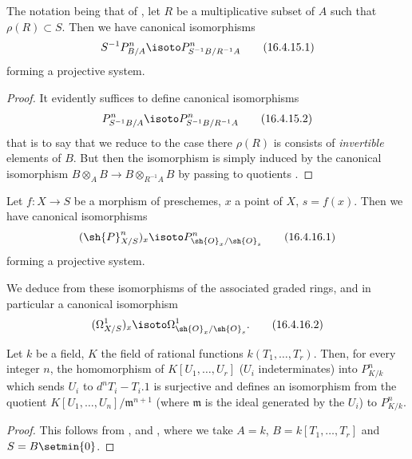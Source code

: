 \begin{corollary}[16.4.15]
\label{IV.16.4.15}
The notation being that of , let $R$ be a multiplicative subset of $A$ such that $\rho(R) \subset S$.
Then we have canonical isomorphisms 
\[
  \label{IV.16.4.15.1}
  S^{-1}P_{B/A}^n \isoto P_{S^{-1}B/R^{-1}A}^n
  \tag{16.4.15.1}
\]
forming a projective system.
\end{corollary}

\begin{proof}
It evidently suffices to define canonical isomorphisms 
\[
  \label{IV.16.4.15.2}
  P_{S^{-1}B/A}^n \isoto P_{S^{-1}B/R^{-1}A}^n
  \tag{16.4.15.2}
\]
that is to say that we reduce to the case there $\rho(R)$ is consists of \emph{invertible} elements of $B$.
But then the isomorphism  is simply induced by the canonical isomorphism $B \otimes_A B \to B \otimes_{R^{-1}A} B$ by passing to quotients .
\end{proof}

\begin{corollary}[16.4.16]
\label{IV.16.4.16}
Let $f:X \to S$ be a morphism of preschemes, $x$ a point of $X$, $s = f(x)$.
Then we have canonical isomorphisms
\[
  \label{IV.16.4.16.1}
  (\sh{P}_{X/S}^n)_x \isoto P_{\sh{O}_x/\sh{O}_s}^n
  \tag{16.4.16.1}
\]
forming a projective system.
\end{corollary}

We deduce from these isomorphisms of the associated graded rings, and in particular a canonical isomorphism
\[
  \label{IV.16.4.16.2}
  (\Omega_{X/S}^1)_x \isoto \Omega_{\sh{O}_x/\sh{O}_s}^1.
  \tag{16.4.16.2}
\]

\begin{corollary}[16.4.17]
\label{IV.16.4.17}
Let $k$ be a field, $K$ the field of rational functions $k(T_1, \dots, T_r)$.
Then, for every integer $n$, the homomorphism of $K[U_1, \dots, U_r]$ ($U_i$ indeterminates) into $P_{K/k}^n$ which sends $U_i$ to $d^nT_i - T_i.1$ is surjective and defines an isomorphism from the quotient $K[U_1, \dots, U_n]/\mathfrak{m}^{n+1}$  (where $\mathfrak{m}$ is the ideal generated by the $U_i$) to $P_{K/k}^n$.
\end{corollary}

\begin{proof}
This follows from ,   and , where we take $A = k$, $B = k[T_1, \dots, T_r]$ and $S = B \setmin \{0\}$.
\end{proof}

